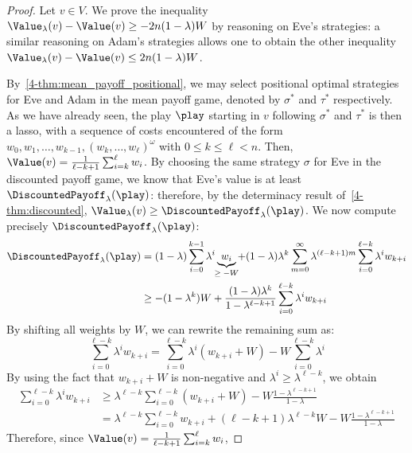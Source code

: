 \begin{proof}
  Let $v\in V$. We prove the inequality
  $\Value_\lambda(v)-\Value(v)\geq -2n(1-\lambda)W$ by reasoning on
  Eve's strategies: a similar reasoning on Adam's strategies allows
  one to obtain the other inequality
  $\Value_\lambda(v)-\Value(v)\leq 2n(1-\lambda)W$.

  By~\cref{4-thm:mean_payoff_positional}, we may select positional optimal
  strategies for Eve and Adam in the mean payoff game, denoted by
  $\sigma^*$ and $\tau^*$ respectively. As we have already seen, the play
  $\play$ starting in $v$ following $\sigma^*$ and $\tau^*$ is then a
  lasso, with a sequence of costs encountered of the form
  $w_0,w_1,\ldots,w_{k-1},(w_k,\ldots,w_\ell)^\omega$ with
  $0\leq k\leq \ell<n$. Then,
  $\Value(v)=\frac 1 {\ell-k+1}\sum_{i=k}^\ell w_i$. By choosing the
  same strategy $\sigma$ for Eve in the discounted payoff game, we
  know that Eve's value is at least
  $\DiscountedPayoff_\lambda(\play)$: therefore, by the determinacy
  result of~\cref{4-thm:discounted},
  $\Value_\lambda(v)\geq \DiscountedPayoff_\lambda(\play)$. We now
  compute precisely $\DiscountedPayoff_\lambda(\play)$:
  \begin{align*}
    \DiscountedPayoff_\lambda(\play)
    &=
      (1-\lambda)\sum_{i=0}^{k-1}\lambda^i
      \underbrace{w_i}_{\makebox[0pt][c]{\scriptsize$\geq -W$}}
      +
      (1-\lambda)\lambda^k\sum_{m=0}^\infty
      \lambda^{(\ell-k+1)m} \sum_{i=0}^{\ell-k}\lambda^iw_{k+i}\\
    & \geq -(1-\lambda^k)W +
      \frac{(1-\lambda) \lambda^k}{1-\lambda^{\ell-k+1}}
      \sum_{i=0}^{\ell-k}\lambda^iw_{k+i} \tag*{\label{4-eq:1}}
  \end{align*}
  By shifting all weights by $W$, we can rewrite the remaining
  sum as:
  \[\sum_{i=0}^{\ell-k}\lambda^iw_{k+i} =
    \sum_{i=0}^{\ell-k}\lambda^i(w_{k+i}+W) -
    W\sum_{i=0}^{\ell-k}\lambda^i\]
  By using the fact that $w_{k+i}+W$ is non-negative and
  $\lambda^i\geq \lambda^{\ell-k}$, we obtain
  \begin{align*}
    \sum_{i=0}^{\ell-k}\lambda^iw_{k+i}
    &\geq \lambda^{\ell-k}
      \sum_{i=0}^{\ell-k}(w_{k+i}+W) -W
      \frac{1-\lambda^{\ell-k+1}}{1-\lambda} \\
    &= \lambda^{\ell-k}
      \sum_{i=0}^{\ell-k}w_{k+i} + (\ell-k+1)\lambda^{\ell-k}W
      -W \frac{1-\lambda^{\ell-k+1}}{1-\lambda}
  \end{align*}
  Therefore, since $\Value(v)=\frac 1 {\ell-k+1}\sum_{i=k}^\ell w_i$,

\end{proof}
